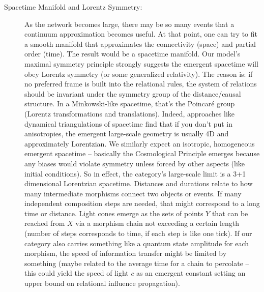 \documentclass{article}
\begin{document}
\begin{description}
\item[Spacetime Manifold and Lorentz Symmetry:] As the network becomes large, there may be so many events that a continuum approximation becomes useful. At that point, one can try to fit a smooth manifold that approximates the connectivity (space) and partial order (time). The result would be a spacetime manifold. Our model’s maximal symmetry principle strongly suggests the emergent spacetime will obey Lorentz symmetry (or some generalized relativity). The reason is: if no preferred frame is built into the relational rules, the system of relations should be invariant under the symmetry group of the distance/causal structure. In a Minkowski-like spacetime, that’s the Poincaré group (Lorentz transformations and translations). Indeed, approaches like dynamical triangulations of spacetime find that if you don’t put in anisotropies, the emergent large-scale geometry is usually 4D and approximately Lorentzian. We similarly expect an isotropic, homogeneous emergent spacetime – basically the Cosmological Principle emerges because any biases would violate symmetry unless forced by other aspects (like initial conditions). So in effect, the category’s large-scale limit is a 3+1 dimensional Lorentzian spacetime. Distances and durations relate to how many intermediate morphisms connect two objects or events. If many independent composition steps are needed, that might correspond to a long time or distance. Light cones emerge as the sets of points $Y$ that can be reached from $X$ via a morphism chain not exceeding a certain length (number of steps corresponds to time, if each step is like one tick). If our category also carries something like a quantum state amplitude for each morphism, the speed of information transfer might be limited by something (maybe related to the average time for a chain to percolate – this could yield the speed of light $c$ as an emergent constant setting an upper bound on relational influence propagation).


\end{description}
\end{document}
